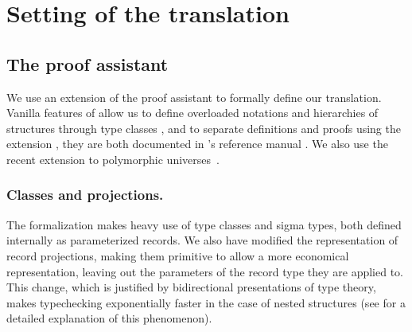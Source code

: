 \section{Setting of the translation}
\label{sec:setting-translation}




\subsection{The proof assistant}
\label{sec:proof-assistant}
We use an extension of the \Coq proof assistant to formally define
our translation. Vanilla features of \Coq allow us to define overloaded
notations and hierarchies of structures through type classes
\cite{sozeau.Coq/classes/fctc}, and to separate definitions and proofs
using the \Program extension \cite{sozeau.Coq/FingerTrees/article}, they
are both documented in \Coq's reference manual \cite{coq:refman:8.4}.
We also use the recent extension to polymorphic universes~\cite{sozeau.Coq/univs/ITP14}.

\subsubsection{Classes and projections.}
The formalization makes heavy use of type classes and sigma types, both
defined internally as parameterized records. We also have modified the
representation of record projections, making them primitive to allow a
more economical representation, leaving out the parameters of the record
type they are applied to. This change, which is justified by
bidirectional presentations of type theory, makes typechecking
exponentially faster in the case of nested structures (see
\cite{garillot:pastel-00649586} for a detailed explanation of this phenomenon).





